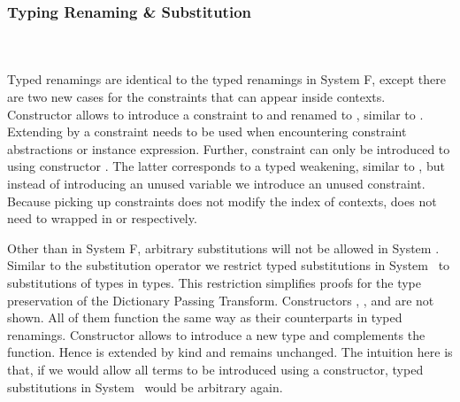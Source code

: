 \subsubsection{Typing Renaming \& Substitution}\hfill\\\\
Typed renamings are identical to the typed renamings in System F, except there are two new cases for the constraints that can appear inside contexts. 
\FoRenTyping
Constructor  allows to introduce a constraint  to  and renamed  to , similar to . Extending by a constraint needs to be used when encountering constraint abstractions or instance expression. Further, constraint  \Constr{:}  can only be introduced to  using constructor . 
The latter corresponds to a typed weakening, similar to , but instead of introducing an unused variable we introduce an unused constraint. Because picking up constraints does not modify the index  of contexts,  does not need to wrapped in  or  respectively.

\noindent Other than in System F, arbitrary substitutions will not be allowed in System \Fo. 
Similar to the substitution operator we restrict typed substitutions in System \Fo\ to substitutions of types in types. This restriction simplifies proofs for the type preservation of the Dictionary Passing Transform.
\FoSubTyping
Constructors , ,  and  are not shown. All of them function the same way as their counterparts in typed renamings.
Constructor  allows to introduce a new type  and complements the  function. Hence  is extended by kind  and  remains unchanged. The intuition here is that, if we would allow all terms to be introduced using a  constructor, typed substitutions in System \Fo\ would be arbitrary again.
